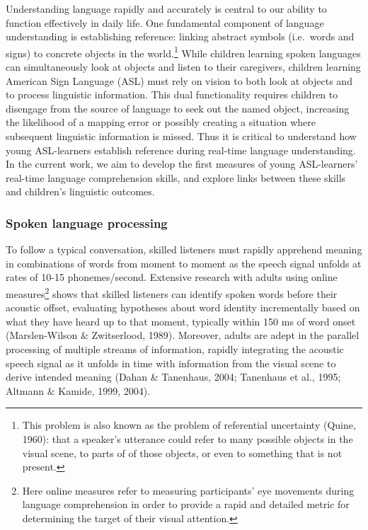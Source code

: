 \documentclass[12pt,]{article}
\let\rmarkdownfootnote\footnote%
\def\footnote{\protect\rmarkdownfootnote}
\begin{document}
Understanding language rapidly and accurately is central to our ability
to function effectively in daily life. One fundamental component of
language understanding is establishing reference: linking abstract
symbols (i.e.~words and signs) to concrete objects in the
world.\footnote{This problem is also known as the problem of referential
  uncertainty (Quine, 1960): that a speaker's utterance could refer to
  many possible objects in the visual scene, to parts of of those
  objects, or even to something that is not present.} While children
learning spoken languages can simultaneously look at objects and listen
to their caregivers, children learning American Sign Language (ASL) must
rely on vision to both look at objects and to process linguistic
information. This dual functionality requires children to disengage from
the source of language to seek out the named object, increasing the
likelihood of a mapping error or possibly creating a situation where
subsequent linguistic information is missed. Thus it is critical to
understand how young ASL-learners establish reference during real-time
language understanding. In the current work, we aim to develop the first
measures of young ASL-learners' real-time language comprehension skills,
and explore links between these skills and children's linguistic
outcomes.

\subsubsection{Spoken language
processing}\label{spoken-language-processing}

To follow a typical conversation, skilled listeners must rapidly
apprehend meaning in combinations of words from moment to moment as the
speech signal unfolds at rates of 10-15 phonemes/second. Extensive
research with adults using online measures\footnote{Here online measures
  refer to measuring participants' eye movements during language
  comprehension in order to provide a rapid and detailed metric for
  determining the target of their visual attention.} shows that skilled
listeners can identify spoken words before their acoustic offset,
evaluating hypotheses about word identity incrementally based on what
they have heard up to that moment, typically within 150 ms of word onset
(Marslen-Wilson \& Zwitserlood, 1989). Moreover, adults are adept in the
parallel processing of multiple streams of information, rapidly
integrating the acoustic speech signal as it unfolds in time with
information from the visual scene to derive intended meaning (Dahan \&
Tanenhaus, 2004; Tanenhaus et al., 1995; Altmann \& Kamide, 1999, 2004).
\end{document}
